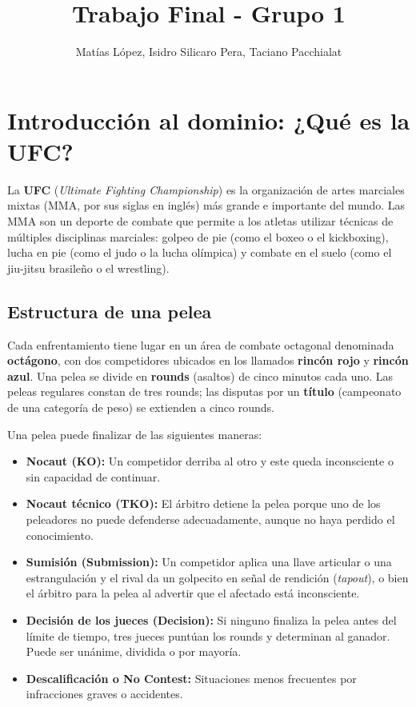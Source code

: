 \documentclass[11pt,a4paper]{article}
\title{\textbf{Trabajo Final - Grupo 1}}
\author{Matías López, Isidro Silicaro Pera, Taciano Pacchialat}
\date{}
\begin{document}
\maketitle

\section{Introducción al dominio: ¿Qué es la UFC?}

La \textbf{UFC} (\textit{Ultimate Fighting Championship}) es la organización de artes marciales mixtas (MMA, por sus siglas en inglés) más grande e importante del mundo. Las MMA son un deporte de combate que permite a los atletas utilizar técnicas de múltiples disciplinas marciales: golpeo de pie (como el boxeo o el kickboxing), lucha en pie (como el judo o la lucha olímpica) y combate en el suelo (como el jiu-jitsu brasileño o el wrestling).

\subsection*{Estructura de una pelea}

Cada enfrentamiento tiene lugar en un área de combate octagonal denominada \textbf{octágono}, con dos competidores ubicados en los llamados \textbf{rincón rojo} y \textbf{rincón azul}. Una pelea se divide en \textbf{rounds} (asaltos) de cinco minutos cada uno. Las peleas regulares constan de tres rounds; las disputas por un \textbf{título} (campeonato de una categoría de peso) se extienden a cinco rounds.

Una pelea puede finalizar de las siguientes maneras:

\begin{itemize}[leftmargin=*]
  \item \textbf{Nocaut (KO):} Un competidor derriba al otro y este queda inconsciente o sin capacidad de continuar.
  \item \textbf{Nocaut técnico (TKO):} El árbitro detiene la pelea porque uno de los peleadores no puede defenderse adecuadamente, aunque no haya perdido el conocimiento.
  \item \textbf{Sumisión (Submission):} Un competidor aplica una llave articular o una estrangulación y el rival da un golpecito en señal de rendición (\textit{tapout}), o bien el árbitro para la pelea al advertir que el afectado está inconsciente.
  \item \textbf{Decisión de los jueces (Decision):} Si ninguno finaliza la pelea antes del límite de tiempo, tres jueces puntúan los rounds y determinan al ganador. Puede ser unánime, dividida o por mayoría.
  \item \textbf{Descalificación o No Contest:} Situaciones menos frecuentes por infracciones graves o accidentes.
\end{itemize}
\end{document}
